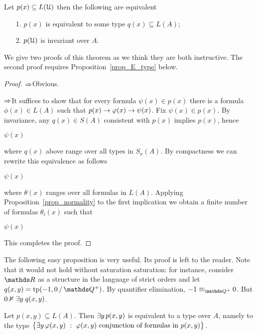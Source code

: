 \documentclass[creche.tex]{subfiles}
\begin{document}
\begin{proposition}\label{prop_inv_types}
Let $p(x)\subseteq L(\EuScript U)$ then the following are equivalent
\begin{itemize}
 \item[1.] $p(x)$ is equivalent to some type $q(x)\subseteq L(A)$;
 \item[2.] $p(\EuScript U)$ is invariant over $A$.
\end{itemize}
\end{proposition}

We give two proofs of this theorem as we think they are both instructive.  The second proof requires Proposition~\ref{prop_E_type} below.

\begin{proof}
$\Rightarrow$\quad Obvious. 

$\Rightarrow$\quad It suffices to show that for every formula $\psi(x)\in p(x)$ there is a formula $\phi(x)\in L(A)$ such that $p(x)\rightarrow\varphi(x)\rightarrow\psi(x)$. Fix $\psi(x)\in p(x)$. By invariance, any $q(x)\in S(A)$ consistent with $p(x)$ implies $p(x)$, hence

\medrel{\imp}$\psi(x)$

where $q(x)$ above range over all types in $S_x(A)$. By compactness we can rewrite this equivalence as follows

\medrel{\imp}$\psi(x)$

where $\theta(x)$ ranges over all formulas in $L(A)$. Applying Proposition~\ref{prop_normality} to the first implication we obtain a finite number of formulas $\theta_i(x)$ such that 

\medrel{\imp}$\psi(x)$

This completes the proof.
\end{proof}

The following easy proposition is very useful. Its proof is left to the reader. Note that it would not hold without saturation saturation: for instance, consider $\RR$ as a structure in the language of strict orders and let $q(x,y)=\tp(-1, 0\,/\,\QQ^+)$. By quantifier elimination, $-1\equiv_{\QQ^+}0$. But $0\nvDash\exists y\;q(x,y)$.


\begin{proposition}\label{prop_E_type}
Let $p(x,y)\subseteq L(A)$. Then $\exists y\,p(x,y)$ is equivalent to a type over $A$, namely to the type $\big\{ \E y\,\phi(x,y)\ :\ \phi(x,y) \textrm{ conjunction of formulas in }  p(x,y)\big\}$.\QED 
\end{proposition}
\end{document}
